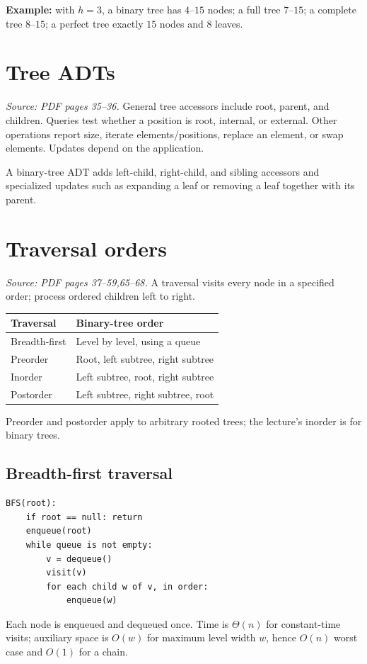 \documentclass[11pt,letterpaper]{article}
\newcommand{\sourcepages}[1]{\textit{Source: PDF pages #1.}}
\begin{document}
\textbf{Example:} with $h=3$, a binary tree has $4$--$15$ nodes; a full tree $7$--$15$; a complete tree $8$--$15$; a perfect tree exactly $15$ nodes and $8$ leaves.

\section{Tree ADTs}
\sourcepages{35--36}
General tree accessors include root, parent, and children. Queries test whether a position is root, internal, or external. Other operations report size, iterate elements/positions, replace an element, or swap elements. Updates depend on the application.

A binary-tree ADT adds left-child, right-child, and sibling accessors and specialized updates such as expanding a leaf or removing a leaf together with its parent.

\section{Traversal orders}
\sourcepages{37--59,65--68}
A traversal visits every node in a specified order; process ordered children left to right.
\begin{center}\begin{tabular}{@{}ll@{}}\toprule
Traversal & Binary-tree order\\\midrule
Breadth-first & Level by level, using a queue\\
Preorder & Root, left subtree, right subtree\\
Inorder & Left subtree, root, right subtree\\
Postorder & Left subtree, right subtree, root\\\bottomrule
\end{tabular}\end{center}
Preorder and postorder apply to arbitrary rooted trees; the lecture's inorder is for binary trees.

\subsection{Breadth-first traversal}
\par\noindent\begin{minipage}{\linewidth}
\begin{lstlisting}
BFS(root):
    if root == null: return
    enqueue(root)
    while queue is not empty:
        v = dequeue()
        visit(v)
        for each child w of v, in order:
            enqueue(w)
\end{lstlisting}
\end{minipage}\par
Each node is enqueued and dequeued once. Time is $\Theta(n)$ for constant-time visits; auxiliary space is $O(w)$ for maximum level width $w$, hence $O(n)$ worst case and $O(1)$ for a chain.
\end{document}
